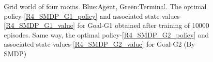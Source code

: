 \documentclass[preprint,12pt]{elsarticle}
\begin{document}
\begin{figure}[H]
	\centering  
	\caption{Grid world of four rooms.  Blue:Agent, Green:Terminal. The optimal policy-\ref{R4_SMDP_G1_policy} and associated state values-\ref{R4_SMDP_G1_value} for Goal-G1 obtained after training of 10000 episodes. Same way, the optimal policy-\ref{R4_SMDP_G2_policy} and associated state values-\ref{R4_SMDP_G2_value} for Goal-G2 (By SMDP) }
	\label{fig:R4_SMDP}
\end{figure}
\end{document}
